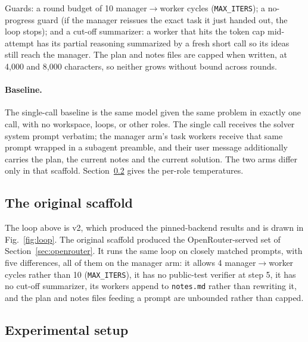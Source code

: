 \documentclass{article}
\begin{document}
Guards: a round budget of 10 manager$\to$worker cycles
(\texttt{MAX\_ITERS}); a no-progress guard (if the manager reissues the exact task it just
handed out, the loop stops); and a cut-off summarizer: a worker that hits the token cap
mid-attempt has its partial reasoning summarized by a fresh short call so its ideas still
reach the manager. The plan and notes files are capped when written, at 4,000 and 8,000
characters, so neither grows without bound across rounds.

\newpage
\paragraph{Baseline.} The single-call baseline is the same model given the same problem in exactly one call, with no
workspace, loops, or other roles. The single call receives the solver
system prompt verbatim; the manager arm's task workers receive that same prompt wrapped in a
subagent preamble, and their user message additionally
carries the plan, the current notes and the current solution. The two arms differ only in
that scaffold. Section~\ref{sec:setup} gives the per-role temperatures.

\subsection{The original scaffold}
\label{sec:scaffold-v1}

The loop above is v2, which produced the pinned-backend results and is drawn in
Fig.~\ref{fig:loop}. The original scaffold produced the OpenRouter-served set of
Section~\ref{sec:openrouter}. It runs the same loop on closely matched prompts, with five
differences, all of them on the manager arm: it allows 4 manager$\to$worker cycles rather than 10
(\texttt{MAX\_ITERS}), it has no public-test verifier at step 5, it has no cut-off summarizer, its
workers append to \texttt{notes.md} rather than rewriting it, and the plan and notes files feeding
a prompt are unbounded rather than capped.

\subsection{Experimental setup}
\label{sec:setup}
\end{document}
